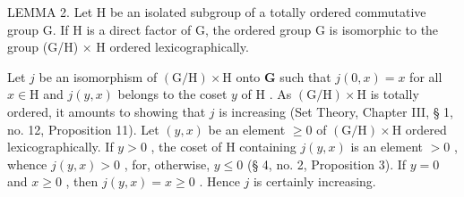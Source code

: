 LEMMA 2. Let H be an isolated subgroup of a totally ordered commutative group G. If H is a direct factor of G, the ordered group G is isomorphic to the group (G/H) × H ordered lexicographically.

Let \(j\) be an isomorphism of \((\mathrm{G} / \mathrm{H}) \times \mathrm{H}\) onto \(\mathbf{G}\) such that \(j(0, x) = x\) for all \(x \in \mathrm{H}\) and \(j(y, x)\) belongs to the coset \(y\) of \(\mathrm{H}\) . As \((\mathrm{G} / \mathrm{H}) \times \mathrm{H}\) is totally ordered, it amounts to showing that \(j\) is increasing (Set Theory, Chapter III, § 1, no. 12, Proposition 11). Let \((y, x)\) be an element \(\geqslant 0\) of \((\mathrm{G} / \mathrm{H}) \times \mathrm{H}\) ordered lexicographically. If \(y > 0\) , the coset of \(\mathrm{H}\) containing \(j(y, x)\) is an element \(> 0\) , whence \(j(y, x) > 0\) , for, otherwise, \(y \leqslant 0\) (§ 4, no. 2, Proposition 3). If \(y = 0\) and \(x \geqslant 0\) , then \(j(y, x) = x \geqslant 0\) . Hence \(j\) is certainly increasing.

